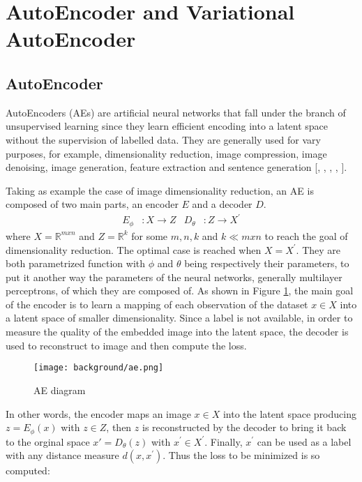 \section{AutoEncoder and Variational AutoEncoder}

\subsection{AutoEncoder}
AutoEncoders (AEs) are artificial neural networks that fall under the branch of unsupervised learning since they learn efficient encoding into a latent space without the supervision of labelled data. They are generally used for vary purposes, for example, dimensionality reduction, image compression, image denoising, image generation, feature extraction and sentence generation [\citet{doi:10.1126/science.1127647}, \citet{8456308}, \citet{7836672}, \citet{7926714}, \citet{8852155}]. 

Taking as example the case of image dimensionality reduction, an AE is composed of two main parts, an encoder $E$ and a decoder $D$. 
\begin{align}
  E_\phi &:  X \rightarrow Z & D_\theta &:  Z \rightarrow X^{'}
\end{align}
where $X = \mathbb{R}^{mxn}$ and $Z = \mathbb{R}^{k }$ for some $m,n,k$ and $k\ll mxn$ to reach the goal of dimensionality reduction. The optimal case is reached when $X=X^{'} $. They are both parametrized function with $\phi$ and $\theta$ being respectively their parameters, to put it another way the parameters of the neural networks, generally multilayer perceptrons, of which they are composed of.
As shown in Figure \ref{fig:ae}, the main goal of the encoder is to learn a mapping of each observation of the dataset $x \in X$ into a latent space of smaller dimensionality.  Since a label is not available, in order to measure the quality of the embedded image into the latent space, the decoder is used to reconstruct to image and then compute the loss.

\begin{figure}[h]
  \begin{center}
    \texttt{[image: background/ae.png]}
  \end{center}
  \caption{AE diagram}
  \label{fig:ae}
\end{figure}

In other words, the encoder maps an image $x\in X$ into the latent space producing ${z=E_{\phi }(x)}$ with $z\in Z$, then $z$ is reconstructed by the decoder to bring it back to the orginal space ${x'=D_{\theta }(z)}$ with $x^{'}\in X^{'}$. Finally, $x^{'}$ can be used as a label with any distance measure $d(x,x^{'})$. Thus the loss to be minimized is so computed:

